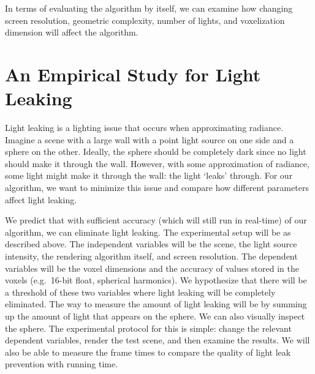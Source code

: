 In terms of evaluating the algorithm by itself, we can examine how changing screen resolution, geometric complexity, number of lights, and voxelization dimension will affect the algorithm. 

\section{An Empirical Study for Light Leaking}
Light leaking is a lighting issue that occurs when approximating radiance. Imagine a scene with a large wall with a point light source on one side and a sphere on the other. Ideally, the sphere should be completely dark since no light should make it through the wall. However, with some approximation of radiance, some light might make it through the wall: the light `leaks' through. For our algorithm, we want to minimize this issue and compare how different parameters affect light leaking.

We predict that with sufficient accuracy (which will still run in real-time) of our algorithm, we can eliminate light leaking. The experimental setup will be as described above. The independent variables will be the scene, the light source intensity, the rendering algorithm itself, and screen resolution. The dependent variables will be the voxel dimensions and the accuracy of values stored in the voxels (e.g.\ 16-bit float, spherical harmonics). We hypothesize that there will be a threshold of these two variables where light leaking will be completely eliminated. The way to measure the amount of light leaking will be by summing up the amount of light that appears on the sphere. We can also visually inspect the sphere. The experimental protocol for this is simple: change the relevant dependent variables, render the test scene, and then examine the results. We will also be able to measure the frame times to compare the quality of light leak prevention with running time.
